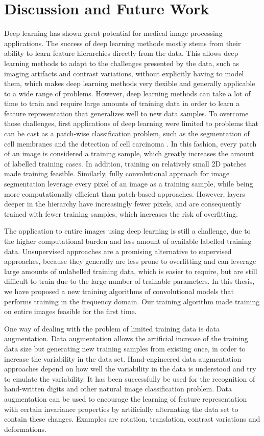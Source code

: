 \chapter{Discussion and Future Work}

Deep learning has shown great potential for medical image processing
applications. The success of deep learning methods mostly stems from their
ability to learn feature hierarchies directly from the data. This allows deep
learning methods to adapt to the challenges presented by the data, such as
imaging artifacts and contrast variations, without explicitly having to model
them, which makes deep learning methods very flexible and generally applicable
to a wide range of problems. However, deep learning methods can take a lot of
time to train and require large amounts of training data in order to learn a
feature representation that generalizes well to new data samples. To overcome
those challenges, first applications of deep learning were limited to problems
that can be cast as a patch-wise classification problem, such as the
segmentation of cell membranes \citep{ciresan2012} and the detection of cell
carcinoma \citep{cancer}. In this fashion, every patch of an image is considered
a training sample, which greatly increases the amount of labelled training
cases. In addition, training on relatively small 2D patches made training
feasible. Similarly, fully convolutional approach for image segmentation
leverage every pixel of an image as a training sample, while being more
computationally efficient than patch-based approaches. However, layers deeper in
the hierarchy have increasingly fewer pixels, and are consequently trained with
fewer training samples, which increases the risk of overfitting.

The application to entire images using deep learning is still a challenge, due
to the higher computational burden and less amount of available labelled
training data. Unsupervised approaches are a promising alternative to supervised
approaches, because they generally are less prone to overfitting and can
leverage large amounts of unlabelled training data, which is easier to require,
but are still difficult to train due to the large number of trainable
parameters. In this thesis, we have proposed a new training algorithms of
convolutional models that performs training in the frequency domain. Our
training algorithm made training on entire images feasible for the first time.

One way of dealing with the problem of limited training data is data
augmentation. Data augmentation allows the artificial increase of the training
data size but generating new training samples from existing once, in order to
increase the variability in the data set. Hand-engineered data augmentation
approaches depend on how well the variability in the data is understood and try
to emulate the variability. It has been successfully be used for the recognition
of hand-written digits and other natural image classification problem. Data
augmentation can be used to encourage the learning of feature representation
with certain invariance properties by artificially alternating the data set to
contain these changes. Examples are rotation, translation, contrast variations
and deformations.

